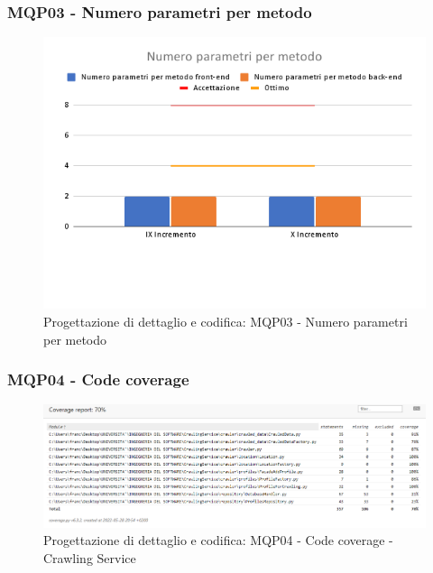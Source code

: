\subsubsection{MQP03 - Numero parametri per metodo}
\begin{figure}[H]
    \centering
    \includegraphics[scale=0.50]{Sezioni/images/last_prodotto/Numero_parametri_per_metodo.png}
    \caption{Progettazione di dettaglio e codifica: MQP03 - Numero parametri per metodo}
\end{figure}
\subsubsection{MQP04 - Code coverage}
\begin{figure}[H]
    \centering
    \includegraphics[scale=0.50]{Sezioni/images/last_prodotto/coverage-CS.PNG}
    \caption{Progettazione di dettaglio e codifica: MQP04 - Code coverage - Crawling Service}
\end{figure}

